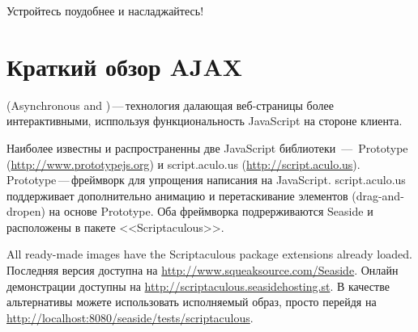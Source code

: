 \documentclass[a4paper,10pt,twoside]{book}
\begin{document}

Устройтесь поудобнее и насладжайтесь!


\section{Краткий обзор AJAX}



 (Asynchronous  and )\,---\,технология
далающая веб-страницы более интерактивными, исппользуя
функциональность JavaScript на стороне клиента.


Наиболее известны и распространенны две JavaScript библиотеки \,---\,
Prototype (\url{http://www.prototypejs.org}) и script.aculo.us
(\url{http://script.aculo.us}).
Prototype\,---\,фреймворк для упрощения написания на JavaScript.
script.aculo.us поддерживает дополнительно анимацию и перетаскивание
элементов (drag-and-dropen) на основе Prototype. Оба фреймворка
подрерживаются Seaside и расположены в пакете <<Scriptaculous>>.


All ready-made images have the Scriptaculous package extensions already loaded.
Последняя версия доступна на \url{http://www.squeaksource.com/Seaside}.
Онлайн демонстрации доступны на \url{http://scriptaculous.seasidehosting.st}.
В качестве альтернативы можете использовать исполняемый образ,
просто перейдя на \url{http://localhost:8080/seaside/tests/scriptaculous}.
\end{document}
